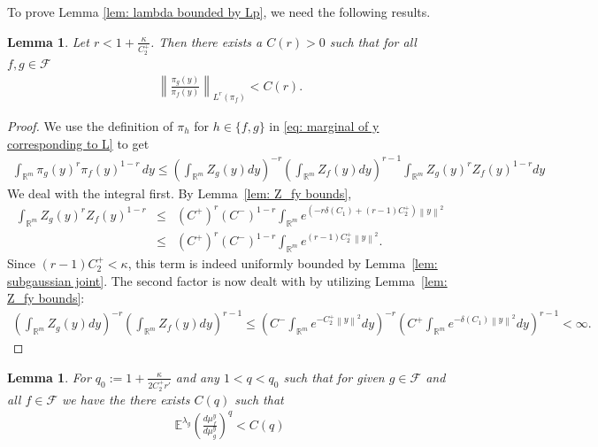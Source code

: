 \documentclass{amsart}
\newtheorem{lemma}[theorem]{Lemma}
\theoremstyle{definition}
\newcommand{\E}{{\mathbb E}}
\newcommand{\R}{{\mathbb R}}
\newcommand{\norm}[1]{\left\|#1\right\|}
\newcommand{\F}{\mathcal{F}}
\begin{document}
To prove Lemma \ref{lem: lambda bounded by Lp}, we need the following results.
\begin{lemma}\label{lem: rn^q for marginal}
    Let $r < 1 + \frac{\kappa}{C_2^+}$. Then there exists a $C(r)>0$ such that for all $f, g\in \F$
    \begin{eqnarray*}
        \norm{\frac{\pi_g(y)}{\pi_f(y)}}_{L^{r}(\pi_f)} < C(r).
    \end{eqnarray*}
\end{lemma}
\begin{proof}
We use the definition of $\pi_h$ for $h \in \{f, g\}$ in \eqref{eq: marginal of y corresponding to L} to get
    \begin{align*}
        \int_{\R^m} \pi_g(y)^{r} \pi_f(y)^{1-r} \, dy \le \left(\int_{\R^m} Z_g(y) dy\right)^{-r} \left(\int_{\R^m} Z_f(y) dy\right)^{r-1} \int_{\R^m} Z_g(y)^{r} Z_f(y)^{1-r} dy
    \end{align*}
   We deal with the integral first. By Lemma~\ref{lem: Z_fy bounds},
    \begin{eqnarray*}
        \int_{\R^m} Z_g(y)^{r} Z_f(y)^{1-r} 
        & \le & (C^+)^r (C^-)^{1-r} \int_{\R^m} e^{(-r \delta(C_1) + (r-1) C_2^+) \norm{y}^2} \\
        & \le & (C^+)^r (C^-)^{1-r} \int_{\R^m} e^{(r-1) C_2^+ \norm{y}^2}.
    \end{eqnarray*}
    Since $(r-1) C_2^+ < \kappa$, this term is indeed uniformly bounded by Lemma~\ref{lem: subgaussian joint}.
    The second factor is now dealt with by utilizing Lemma~\ref{lem: Z_fy bounds}:
    \begin{eqnarray*}
        \left(\int_{\R^m}  Z_g(y) dy\right)^{-r} \left(\int_{\R^m}  Z_f(y) dy\right)^{r-1} \le  \left(C^-\int_{\R^m}  e^{-C_2^+ \norm{y}^2} dy\right)^{-r} \left(C^+\int_{\R^m}  e^{-\delta(C_1) \norm{y}^2} dy\right)^{r-1}  < \infty.
    \end{eqnarray*}
\end{proof}
\begin{lemma}\label{lem: rn^q}
    For $q_0:= 1 +\frac{\kappa}{2 C_2^+ r'}$ and any $1 < q < q_0$ such that for given $g \in \F$ and all $f \in \F$ we have the there exists $C(q)$ such that
    \begin{eqnarray*}
       \E^{\lambda_g} \left( \frac{ d \mu^y_f}{d \mu_g^y}\right)^q < C(q)
    \end{eqnarray*}
\end{lemma}
\end{document}
